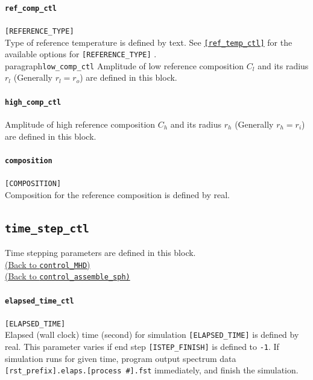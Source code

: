 \paragraph{\tt ref\_comp\_ctl}
\label{href_t:ref_comp_ctl}
\verb|[REFERENCE_TYPE]| \\
Type of reference temperature is defined by text. See  \hyperref[href_t:ref_temp_ctl]{\tt [ref\_temp\_ctl]} for the available options for \verb|[REFERENCE_TYPE]| .
%
\\paragraph{\tt low\_comp\_ctl}
\label{href_t:low_comp_ctl}
Amplitude of low reference composition $C_{l}$ and its radius $r_{l}$ (Generally $r_{l} = r_{o}$) are defined in this block.

\paragraph{\tt high\_comp\_ctl}
\label{href_t:high_comp_ctl}
Amplitude of high reference composition $C_{h}$ and its radius $r_{h}$ (Generally $r_{h} = r_{i}$) are defined in this block.

\paragraph{\tt composition}
\label{href_t:composition}
\verb|[COMPOSITION]| \\
Composition for the reference composition is defined by real.


\subsection{\tt time\_step\_ctl}
\label{href_t:time_step_ctl}
Time stepping parameters are defined in this block. \\
\hyperref[href_i:time_step_ctl]{(Back to {\tt control\_MHD})} \\
\hyperref[href_i:time_step_ctl2]{(Back to {\tt control\_assemble\_sph)}}

\paragraph{\tt elapsed\_time\_ctl}
\label{href_t:elapsed_time_ctl}
\verb|[ELAPSED_TIME]| \\
Elapsed (wall clock) time (second) for simulation \verb|[ELAPSED_TIME]| is defined by real. 
This parameter varies if end step \verb|[ISTEP_FINISH]| is defined to {\tt -1}. If simulation runs for given time, program output spectrum data  \verb|[rst_prefix].elaps.[process #].fst| immediately, and finish the simulation.

